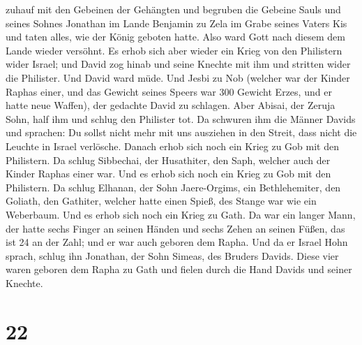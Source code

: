 zuhauf mit den Gebeinen der Gehängten  und begruben die
Gebeine Sauls und seines Sohnes Jonathan im Lande Benjamin zu Zela im
Grabe seines Vaters Kis und taten alles, wie der König geboten hatte.
Also ward Gott nach diesem dem Lande wieder versöhnt.  Es
erhob sich aber wieder ein Krieg von den Philistern wider Israel; und
David zog hinab und seine Knechte mit ihm und stritten wider die
Philister. Und David ward müde.  Und Jesbi zu Nob
(welcher war der Kinder Raphas einer, und das Gewicht seines Speers war
300 Gewicht Erzes, und er hatte neue Waffen), der gedachte David zu
schlagen.  Aber Abisai, der Zeruja Sohn, half ihm und
schlug den Philister tot. Da schwuren ihm die Männer Davids und
sprachen: Du sollst nicht mehr mit uns ausziehen in den Streit, dass
nicht die Leuchte in Israel verlösche.  Danach erhob sich
noch ein Krieg zu Gob mit den Philistern. Da schlug Sibbechai, der
Husathiter, den Saph, welcher auch der Kinder Raphas einer war.
 Und es erhob sich noch ein Krieg zu Gob mit den
Philistern. Da schlug Elhanan, der Sohn Jaere-Orgims, ein Bethlehemiter,
den Goliath, den Gathiter, welcher hatte einen Spieß, des Stange war wie
ein Weberbaum.  Und es erhob sich noch ein Krieg zu Gath.
Da war ein langer Mann, der hatte sechs Finger an seinen Händen und
sechs Zehen an seinen Füßen, das ist 24 an der Zahl; und er war auch
geboren dem Rapha.  Und da er Israel Hohn sprach, schlug
ihn Jonathan, der Sohn Simeas, des Bruders Davids.  Diese
vier waren geboren dem Rapha zu Gath und fielen durch die Hand Davids
und seiner Knechte.

\hypertarget{section-21}{%
\section{22}\label{section-21}}

